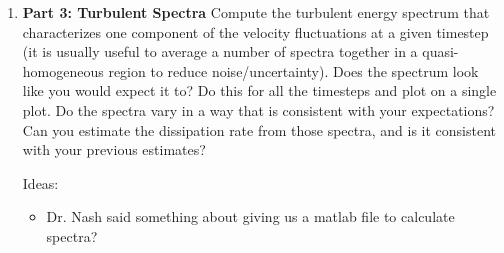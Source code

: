 \documentclass[11pt]{article}
\begin{document}
\begin{enumerate}
    \item \textbf{Part 3: Turbulent Spectra} Compute the turbulent energy spectrum that characterizes one component of the velocity fluctuations at a given timestep (it is usually useful to average a number of spectra together in a quasi-homogeneous region to reduce noise/uncertainty). Does the spectrum look like you would expect it to? Do this for all the timesteps and plot on a single plot. Do the spectra vary in a way that is consistent with your expectations? Can you estimate the dissipation rate from those spectra, and is it consistent with your previous estimates?
    
    Ideas:
    \begin{itemize}
        \item Dr. Nash said something about giving us a matlab file to calculate spectra?
    \end{itemize}



\end{enumerate}
\end{document}

